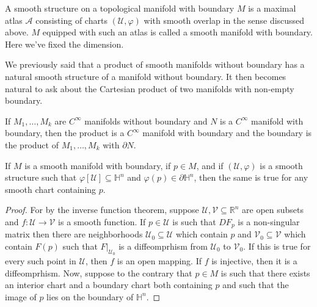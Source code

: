         \begin{definition}
            A smooth structure on a topological manifold with boundary $M$ is a
            maximal atlas $\mathcal{A}$ consisting of charts
            $(\mathcal{U},\varphi)$ with smooth overlap in the sense discussed
            above. $M$ equipped with such an atlas is called a smooth manifold
            with boundary. Here we've fixed the dimension.
        \end{definition}
        We previously said that a product of smooth manifolds without boundary
        has a natural smooth structure of a manifold without boundary. It then
        becomes natural to ask about the Cartesian product of two manifolds
        with non-empty boundary.\
        \begin{theorem}
            If $M_{1},\dots,M_{k}$ are $C^{\infty}$ manifolds without boundary
            and $N$ is a $C^{\infty}$ manifold with boundary, then the product
            is a $C^{\infty}$ manifold with boundary and the boundary is
            the product of $M_{1},\dots,M_{k}$ with $\partial{N}$.
        \end{theorem}
        \begin{theorem}
            If $M$ is a smooth manifold with boundary, if $p\in{M}$, and if
            $(\mathcal{U},\varphi)$ is a smooth structure such that
            $\varphi[\mathcal{U}]\subseteq\mathbb{H}^{n}$ and
            $\varphi(p)\in\partial\mathbb{H}^{n}$, then the same is true for any
            smooth chart containing $p$.
        \end{theorem}
        \begin{proof}
            For by the inverse function theorem, suppose
            $\mathcal{U},\mathcal{V}\subseteq\mathbb{R}^{n}$ are open subsets
            and $f:\mathcal{U}\rightarrow\mathcal{V}$ is a smooth function. If
            $p\in\mathcal{U}$ is such that $DF_{p}$ is a non-singular matrix
            then there are neighborhoods $\mathcal{U}_{0}\subseteq\mathcal{U}$
            which contain $p$ and $\mathcal{V}_{0}\subseteq\mathcal{V}$ which
            contain $F(p)$ such that $F|_{\mathcal{U}_{0}}$ is a diffeomprhism
            from $\mathcal{U}_{0}$ to $\mathcal{V}_{0}$. If this is true for
            every such point in $\mathcal{U}$, then $f$ is an open mapping. If
            $f$ is injective, then it is a diffeomprhism. Now, suppose to the
            contrary that $p\in{M}$ is such that there exists an interior chart
            and a boundary chart both containing $p$ and such that the image
            of $p$ lies on the boundary of $\mathbb{H}^{n}$.
        \end{proof}
